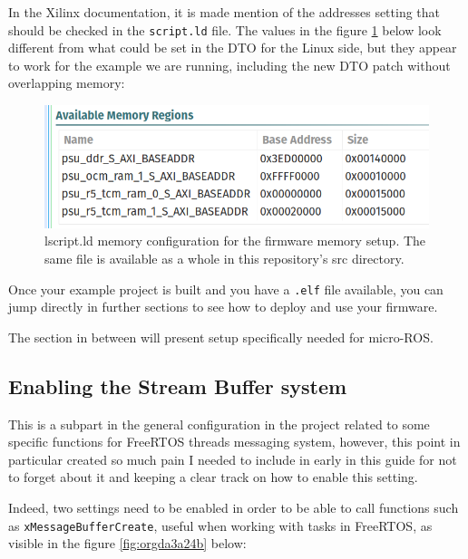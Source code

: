 \documentclass[10pt]{article}
\begin{document}
\pagebreak
In the Xilinx documentation, it is made mention of the addresses setting that should be checked in the \texttt{script.ld} file.
The values in the figure \ref{fig:orgb3fcc4b} below look different from what could be set in the DTO for the Linux side, but they appear to
work for the example we are running, including the new DTO patch without overlapping memory:


\begin{figure}[htbp]
\centering
\includegraphics[width=.6\textwidth]{./img/vitis_new/project_mem.png}
\caption{\label{fig:orgb3fcc4b}lscript.ld memory configuration for the firmware memory setup. The same file is available as a whole in this repository's src directory.}
\end{figure}


Once your example project is built and you have a \texttt{.elf} file available, you can
jump directly in further sections to see how to deploy and use your firmware.

The section in between will present setup specifically needed for micro-ROS.

\subsection{Enabling the Stream Buffer system}
\label{sec:org0f7615e}
This is a subpart in the general configuration in the project related to some specific
functions for FreeRTOS threads messaging system, however, this point in particular
created so much pain I needed to include in early in this guide for not to forget about it
and keeping a clear track on how to enable this setting.

Indeed, two settings need to be enabled in order to be able to call
functions such as \texttt{xMessageBufferCreate}, useful when working with tasks
in FreeRTOS, as visible in the figure \ref{fig:orgda3a24b} below:
\end{document}
